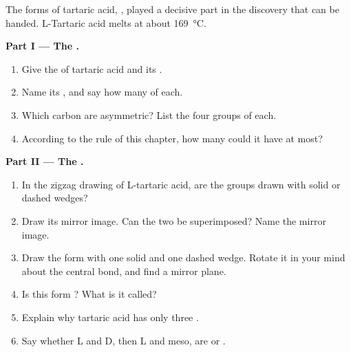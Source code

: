 \begin{problem}
\label{pb:g12:stereochemistry:1}
The forms of tartaric acid, , played a
decisive part in the discovery that  can be handed. L-Tartaric acid melts at about \qty{169}{\celsius}.

\medskip
\noindent\textbf{Part I --- The .}
\begin{enumerate}
  \item Give the  of tartaric acid and its .
  \item Name its , and say how many of each.
  \item Which carbon  are asymmetric? List the four groups of each.
  \item According to the rule of this chapter, how many 
        could it have at most?
\end{enumerate}

\medskip
\noindent\textbf{Part II --- The .}
\begin{enumerate}[resume]
  \item In the zigzag drawing of L-tartaric acid, are the  groups
        drawn with solid or dashed wedges?
  \item Draw its mirror image. Can the two be superimposed? Name the
        mirror image.
  \item Draw the form with one solid and one dashed wedge. Rotate it in
        your mind about the central bond, and find a mirror plane.
  \item Is this form ? What is it called?
  \item Explain why tartaric acid has only three .
  \item Say whether L and D, then L and meso, are  or
        .
\end{enumerate}


\end{problem}
